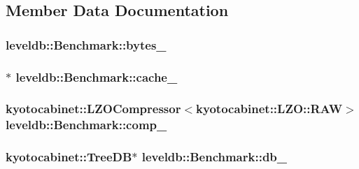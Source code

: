 \subsection{Member Data Documentation}
\hypertarget{classleveldb_1_1_benchmark_a25cccb81c8110b9976e00af2cc1efc4c}{
\subsubsection[{bytes\-\_\-}]{ leveldb\-::\-Benchmark\-::bytes\-\_\-\hspace{0.3cm}{\ttfamily [private]}}}\label{classleveldb_1_1_benchmark_a25cccb81c8110b9976e00af2cc1efc4c}
\hypertarget{classleveldb_1_1_benchmark_af051c32dbe15c131de7cd273517b1dfb}{
\subsubsection[{cache\-\_\-}]{$\ast$ leveldb\-::\-Benchmark\-::cache\-\_\-\hspace{0.3cm}{\ttfamily [private]}}}\label{classleveldb_1_1_benchmark_af051c32dbe15c131de7cd273517b1dfb}
\hypertarget{classleveldb_1_1_benchmark_aa81b0851626974e65e302735393c937d}{
\subsubsection[{comp\-\_\-}]{\setlength{\rightskip}{0pt plus 5cm}kyotocabinet\-::\-L\-Z\-O\-Compressor$<$kyotocabinet\-::\-L\-Z\-O\-::\-R\-A\-W$>$ leveldb\-::\-Benchmark\-::comp\-\_\-\hspace{0.3cm}{\ttfamily [private]}}}\label{classleveldb_1_1_benchmark_aa81b0851626974e65e302735393c937d}
\hypertarget{classleveldb_1_1_benchmark_ac287bb1d708f5e4859ef6633f3769a0c}{
\subsubsection[{db\-\_\-}]{\setlength{\rightskip}{0pt plus 5cm}kyotocabinet\-::\-Tree\-D\-B$\ast$ leveldb\-::\-Benchmark\-::db\-\_\-\hspace{0.3cm}{\ttfamily [private]}}}\label{classleveldb_1_1_benchmark_ac287bb1d708f5e4859ef6633f3769a0c}
